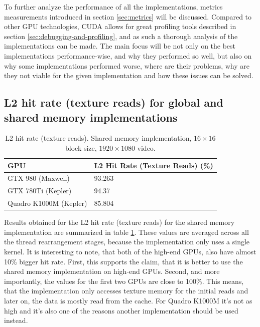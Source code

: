 To further analyze the performance of all the implementations, metrics measurements introduced in section \ref{sec:metrics} will be discussed. Compared to other GPU technologies, CUDA allows for great profiling tools described in section \ref{sec:debugging-and-profiling}, and as such a thorough analysis of the implementations can be made. The main focus will be not only on the best implementations performance-wise, and why they performed so well, but also on why some implementations performed worse, where are their problems, why are they not viable for the given implementation and how these issues can be solved.

\subsection{L2 hit rate (texture reads) for global and shared memory implementations}\label{subsec:prof-l2-hit-rate}

\begin{table}[htbp]
\centering
\begin{tabular}{| l | l |}
\hline
GPU & L2 Hit Rate (Texture Reads) (\%) \\
\hline
GTX 980 (Maxwell) & 93.263 \\
\hline
GTX 780Ti (Kepler) & 94.37 \\
\hline
Quadro K1000M (Kepler) & 85.804 \\
\hline
\end{tabular}
\caption{L2 hit rate (texture reads). Shared memory implementation, $16 \times 16$ block size, $1920 \times 1080$ video.}
\label{tab:l2-hit-rate-shared}
\end{table}

Results obtained for the L2 hit rate (texture reads) for the shared memory implementation are summarized in table \ref{tab:l2-hit-rate-shared}. These values are averaged across all the thread rearrangement stages, because the implementation only uses a single kernel. It is interesting to note, that both of the high-end GPUs, also have almost 10\% bigger hit rate. First, this supports the claim, that it is better to use the shared memory implementation on high-end GPUs. Second, and more importantly, the values for the first two GPUs are close to 100\%. This means, that the implementation only accesses texture memory for the initial reads and later on, the data is mostly read from the cache. For Quadro K1000M it's not as high and it's also one of the reasons another implementation should be used instead.


